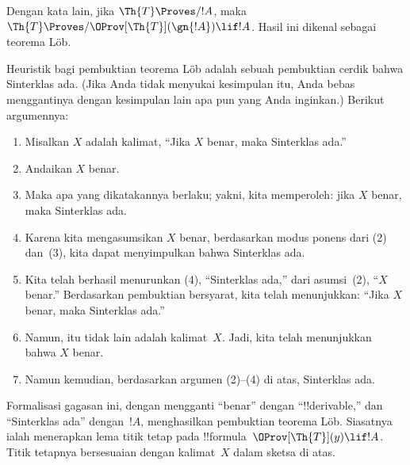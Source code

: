 \documentclass[../../../include/open-logic-section]{subfiles}
\begin{document}
Dengan kata lain, jika $\Th{T} \Proves/ !A$, maka $\Th{T} \Proves/
\OProv[\Th{T}](\gn{!A}) \lif !A$. Hasil ini dikenal sebagai teorema L\"ob.

\begin{explain}
Heuristik bagi pembuktian teorema L\"ob adalah sebuah pembuktian cerdik
bahwa Sinterklas ada. (Jika Anda tidak menyukai kesimpulan itu, Anda bebas
menggantinya dengan kesimpulan lain apa pun yang Anda inginkan.) Berikut
argumennya:
\begin{enumerate}
\item Misalkan $X$ adalah kalimat, ``Jika $X$ benar, maka Sinterklas ada.''
\item Andaikan $X$ benar.
\item Maka apa yang dikatakannya berlaku; yakni, kita memperoleh: jika $X$
  benar, maka Sinterklas ada.
\item Karena kita mengasumsikan $X$ benar, berdasarkan modus ponens dari
  (2) dan~(3), kita dapat menyimpulkan bahwa Sinterklas ada.
\item Kita telah berhasil menurunkan (4), ``Sinterklas ada,'' dari
  asumsi~(2), ``$X$ benar.'' Berdasarkan pembuktian bersyarat, kita telah
  menunjukkan: ``Jika $X$ benar, maka Sinterklas ada.''
\item Namun, itu tidak lain adalah kalimat~$X$. Jadi, kita telah menunjukkan
  bahwa $X$ benar.
\item Namun kemudian, berdasarkan argumen (2)--(4) di atas, Sinterklas ada.
\end{enumerate}
Formalisasi gagasan ini, dengan mengganti ``benar'' dengan
``!!{derivable},'' dan ``Sinterklas ada'' dengan~$!A$, menghasilkan
pembuktian teorema L\"ob. Siasatnya ialah menerapkan lema titik tetap pada
!!{formula}~$\OProv[\Th{T}](y) \lif !A$. Titik tetapnya bersesuaian dengan
kalimat~$X$ dalam sketsa di atas.
\end{explain}
\end{document}
